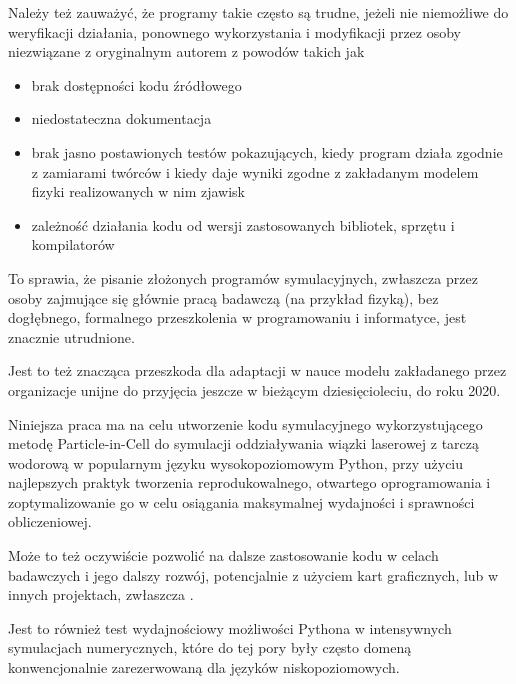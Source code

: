     Należy też zauważyć, że programy takie często są
    trudne, jeżeli nie niemożliwe do weryfikacji działania, ponownego wykorzystania
    i modyfikacji przez osoby niezwiązane z oryginalnym autorem z powodów takich jak
    \begin{itemize}
        \item brak dostępności kodu źródłowego
        \item niedostateczna dokumentacja
        \item brak jasno postawionych testów pokazujących, kiedy program działa
        zgodnie z zamiarami twórców i kiedy daje wyniki zgodne z zakładanym
        modelem fizyki realizowanych w nim zjawisk
        \item zależność działania kodu od wersji zastosowanych bibliotek, sprzętu i kompilatorów
    \end{itemize}

    To sprawia, że pisanie złożonych programów symulacyjnych, zwłaszcza przez osoby
    zajmujące się głównie pracą badawczą (na przykład fizyką), bez dogłębnego, formalnego przeszkolenia
    w programowaniu i informatyce, jest znacznie utrudnione.

    Jest to też znacząca przeszkoda dla adaptacji
    w nauce modelu  zakładanego przez organizacje unijne
    do przyjęcia jeszcze w bieżącym dziesięcioleciu, do roku 2020.

    Niniejsza praca ma na celu utworzenie kodu symulacyjnego wykorzystującego metodę Particle-in-Cell
    do symulacji oddziaływania wiązki laserowej z tarczą wodorową w popularnym języku
    wysokopoziomowym Python, przy użyciu najlepszych praktyk tworzenia reprodukowalnego, otwartego oprogramowania
    i zoptymalizowanie go w celu osiągania maksymalnej wydajności i sprawności obliczeniowej.

    Może to też oczywiście pozwolić na dalsze
    zastosowanie kodu w celach badawczych i jego dalszy rozwój, potencjalnie z użyciem kart graficznych,
    lub w innych projektach, zwłaszcza .

    Jest to również test wydajnościowy możliwości Pythona w intensywnych symulacjach
    numerycznych, które do tej pory były często domeną konwencjonalnie
    zarezerwowaną dla języków niskopoziomowych.
